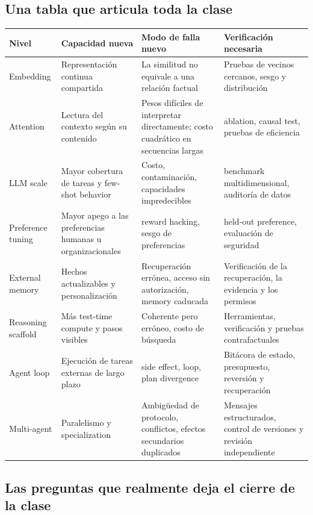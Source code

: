 \subsection{Una tabla que articula toda la clase}

\begin{center}
\begin{longtable}{L{0.17\textwidth} L{0.22\textwidth} L{0.24\textwidth} L{0.25\textwidth}}
\toprule
Nivel & Capacidad nueva & Modo de falla nuevo & Verificación necesaria \\
\midrule
\endhead
Embedding & Representación continua compartida & La similitud no equivale a una relación factual & Pruebas de vecinos cercanos, sesgo y distribución \\
Attention & Lectura del contexto según su contenido & Pesos difíciles de interpretar directamente; costo cuadrático en secuencias largas & ablation, causal test, pruebas de eficiencia \\
LLM scale & Mayor cobertura de tareas y few-shot behavior & Costo, contaminación, capacidades impredecibles & benchmark multidimensional, auditoría de datos \\
Preference tuning & Mayor apego a las preferencias humanas u organizacionales & reward hacking, sesgo de preferencias & held-out preference, evaluación de seguridad \\
External memory & Hechos actualizables y personalización & Recuperación errónea, acceso sin autorización, memory caducada & Verificación de la recuperación, la evidencia y los permisos \\
Reasoning scaffold & Más test-time compute y pasos visibles & Coherente pero erróneo, costo de búsqueda & Herramientas, verificación y pruebas contrafactuales \\
Agent loop & Ejecución de tareas externas de largo plazo & side effect, loop, plan divergence & Bitácora de estado, presupuesto, reversión y recuperación \\
Multi-agent & Paralelismo y specialization & Ambigüedad de protocolo, conflictos, efectos secundarios duplicados & Mensajes estructurados, control de versiones y revisión independiente \\
\bottomrule
\end{longtable}
\end{center}

\subsection{Las preguntas que realmente deja el cierre de la clase}

